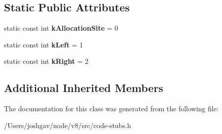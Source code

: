 \subsection*{Static Public Attributes}
\begin{DoxyCompactItemize}
\item 
static const int {\bfseries k\+Allocation\+Site} = 0\hypertarget{classv8_1_1internal_1_1_binary_op_with_allocation_site_stub_ac9a1e0a51bfa2b860c70cb50af440dae}{}\label{classv8_1_1internal_1_1_binary_op_with_allocation_site_stub_ac9a1e0a51bfa2b860c70cb50af440dae}

\item 
static const int {\bfseries k\+Left} = 1\hypertarget{classv8_1_1internal_1_1_binary_op_with_allocation_site_stub_a1d49a26ffcff2e2d1c5ad362f655b8f9}{}\label{classv8_1_1internal_1_1_binary_op_with_allocation_site_stub_a1d49a26ffcff2e2d1c5ad362f655b8f9}

\item 
static const int {\bfseries k\+Right} = 2\hypertarget{classv8_1_1internal_1_1_binary_op_with_allocation_site_stub_aad28a78072bc9eb706fd2afa985f4c9f}{}\label{classv8_1_1internal_1_1_binary_op_with_allocation_site_stub_aad28a78072bc9eb706fd2afa985f4c9f}

\end{DoxyCompactItemize}
\subsection*{Additional Inherited Members}


The documentation for this class was generated from the following file\+:\begin{DoxyCompactItemize}
\item 
/\+Users/joshgav/node/v8/src/code-\/stubs.\+h\end{DoxyCompactItemize}
